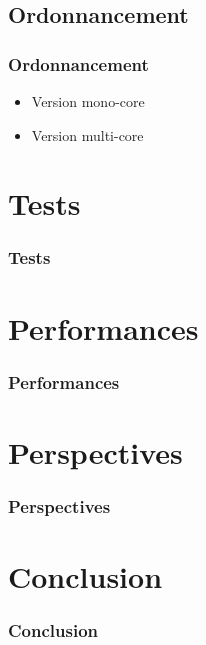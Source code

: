 \documentclass{beamer}
\begin{document}
\subsection{Ordonnancement}

\begin{frame}
  \frametitle{Ordonnancement}
  \begin{itemize}
    \item Version mono-core
    \item Version multi-core
  \end{itemize}
\end{frame}

\section{Tests}

\begin{frame}
  \frametitle{Tests}
\end{frame}

\section{Performances}

\begin{frame}
  \frametitle{Performances}
\end{frame}

\section{Perspectives}

\begin{frame}
  \frametitle{Perspectives}
\end{frame}

\section{Conclusion}

\begin{frame}
  \frametitle{Conclusion}
\end{frame}


 
\end{document}
